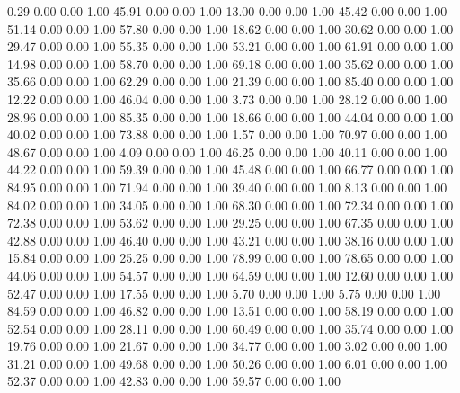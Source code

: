     0.29   0.00   0.00   1.00
   45.91   0.00   0.00   1.00
   13.00   0.00   0.00   1.00
   45.42   0.00   0.00   1.00
   51.14   0.00   0.00   1.00
   57.80   0.00   0.00   1.00
   18.62   0.00   0.00   1.00
   30.62   0.00   0.00   1.00
   29.47   0.00   0.00   1.00
   55.35   0.00   0.00   1.00
   53.21   0.00   0.00   1.00
   61.91   0.00   0.00   1.00
   14.98   0.00   0.00   1.00
   58.70   0.00   0.00   1.00
   69.18   0.00   0.00   1.00
   35.62   0.00   0.00   1.00
   35.66   0.00   0.00   1.00
   62.29   0.00   0.00   1.00
   21.39   0.00   0.00   1.00
   85.40   0.00   0.00   1.00
   12.22   0.00   0.00   1.00
   46.04   0.00   0.00   1.00
    3.73   0.00   0.00   1.00
   28.12   0.00   0.00   1.00
   28.96   0.00   0.00   1.00
   85.35   0.00   0.00   1.00
   18.66   0.00   0.00   1.00
   44.04   0.00   0.00   1.00
   40.02   0.00   0.00   1.00
   73.88   0.00   0.00   1.00
    1.57   0.00   0.00   1.00
   70.97   0.00   0.00   1.00
   48.67   0.00   0.00   1.00
    4.09   0.00   0.00   1.00
   46.25   0.00   0.00   1.00
   40.11   0.00   0.00   1.00
   44.22   0.00   0.00   1.00
   59.39   0.00   0.00   1.00
   45.48   0.00   0.00   1.00
   66.77   0.00   0.00   1.00
   84.95   0.00   0.00   1.00
   71.94   0.00   0.00   1.00
   39.40   0.00   0.00   1.00
    8.13   0.00   0.00   1.00
   84.02   0.00   0.00   1.00
   34.05   0.00   0.00   1.00
   68.30   0.00   0.00   1.00
   72.34   0.00   0.00   1.00
   72.38   0.00   0.00   1.00
   53.62   0.00   0.00   1.00
   29.25   0.00   0.00   1.00
   67.35   0.00   0.00   1.00
   42.88   0.00   0.00   1.00
   46.40   0.00   0.00   1.00
   43.21   0.00   0.00   1.00
   38.16   0.00   0.00   1.00
   15.84   0.00   0.00   1.00
   25.25   0.00   0.00   1.00
   78.99   0.00   0.00   1.00
   78.65   0.00   0.00   1.00
   44.06   0.00   0.00   1.00
   54.57   0.00   0.00   1.00
   64.59   0.00   0.00   1.00
   12.60   0.00   0.00   1.00
   52.47   0.00   0.00   1.00
   17.55   0.00   0.00   1.00
    5.70   0.00   0.00   1.00
    5.75   0.00   0.00   1.00
   84.59   0.00   0.00   1.00
   46.82   0.00   0.00   1.00
   13.51   0.00   0.00   1.00
   58.19   0.00   0.00   1.00
   52.54   0.00   0.00   1.00
   28.11   0.00   0.00   1.00
   60.49   0.00   0.00   1.00
   35.74   0.00   0.00   1.00
   19.76   0.00   0.00   1.00
   21.67   0.00   0.00   1.00
   34.77   0.00   0.00   1.00
    3.02   0.00   0.00   1.00
   31.21   0.00   0.00   1.00
   49.68   0.00   0.00   1.00
   50.26   0.00   0.00   1.00
    6.01   0.00   0.00   1.00
   52.37   0.00   0.00   1.00
   42.83   0.00   0.00   1.00
   59.57   0.00   0.00   1.00
